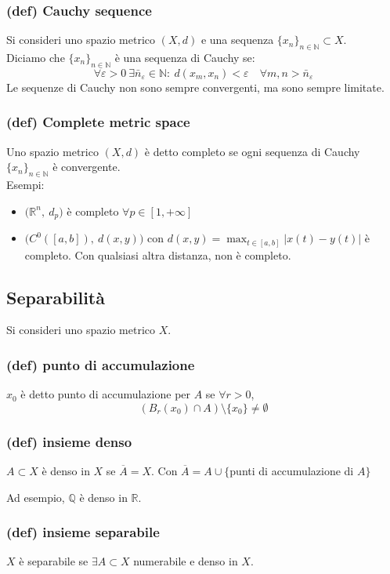 \subsubsection{(def) Cauchy sequence}
Si consideri uno spazio metrico $(X,d)$ e una sequenza $\{x_n\}_{n\in \mathbb N}\subset X$.\\
Diciamo che $\{x_n\}_{n\in \mathbb N}$ è una sequenza di Cauchy se:
$$\forall \varepsilon >0 \ \exists \bar n_\varepsilon\in \mathbb N : \ d(x_m, x_n)<\varepsilon \quad \forall m,n>\bar n_\varepsilon$$
Le sequenze di Cauchy non sono sempre convergenti, ma sono sempre limitate.
\subsubsection{(def) Complete metric space}
Uno spazio metrico $(X,d)$ è detto completo se ogni sequenza di Cauchy $\{x_n\}_{n\in \mathbb N}$ è convergente.\\
Esempi:
\begin{itemize}
    \item $\Big(\mathbb R^n,\ d_p\Big)$ è completo $\forall p\in [1,+\infty]$
    \item $\Big(C^0([a,b]),\ d(x,y)\Big)$ con $d(x,y)=\max_{t\in [a,b]}|x(t)-y(t)|$ è completo. Con qualsiasi altra distanza, non è completo.
    
\end{itemize}

\subsection{Separabilità}
Si consideri uno spazio metrico $X$.
\subsubsection{(def) punto di accumulazione}
$x_0$ è detto punto di accumulazione per $A$ se $\forall r>0$,
$$(B_r(x_0)\cap A)\setminus \{x_0\}\neq \emptyset$$
\subsubsection{(def) insieme denso}
$A\subset X$ è denso in $X$ se $\overline{A}=X$. Con $\overline{A}=A\cup\{$punti di accumulazione di $A\}$

Ad esempio, $\mathbb Q$ è denso in $\mathbb R$.

\subsubsection{(def) insieme separabile}
$X$ è separabile se $\exists A\subset X$ numerabile e denso in $X$.


